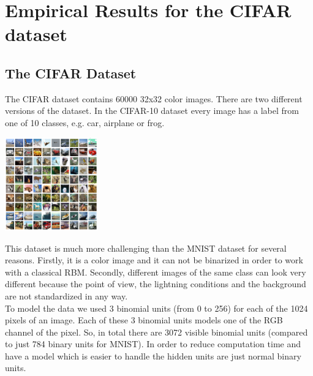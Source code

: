 \documentclass[a4paper]{scrartcl}
\begin{document}
\newpage


\section{Empirical Results for the CIFAR dataset}

\subsection{The CIFAR Dataset}
The CIFAR dataset contains 60000 32x32 color images. There are two different versions of the dataset. In the CIFAR-10 dataset every image has a label from one of 10 classes, e.g. car, airplane or frog. 
\begin{center}
\includegraphics[width=4cm]{images/cifar-10.png}
\end{center} 
This dataset is much more challenging than the MNIST dataset for several reasons. Firstly, it is a color image and it can not be binarized in order to work with a classical RBM. Secondly, different images of the same class can look very different because the point of view, the lightning conditions and the background are not standardized in any way. \\
To model the data we used 3 binomial units (from 0 to 256) for each of the 1024 pixels of an image. Each of these 3 binomial units models one of the RGB channel of the pixel. So, in total there are 3072 visible binomial units (compared to just 784 binary units for MNIST).
In order to reduce computation time and have a model which is easier to handle the hidden units are just normal binary units.
\end{document}
